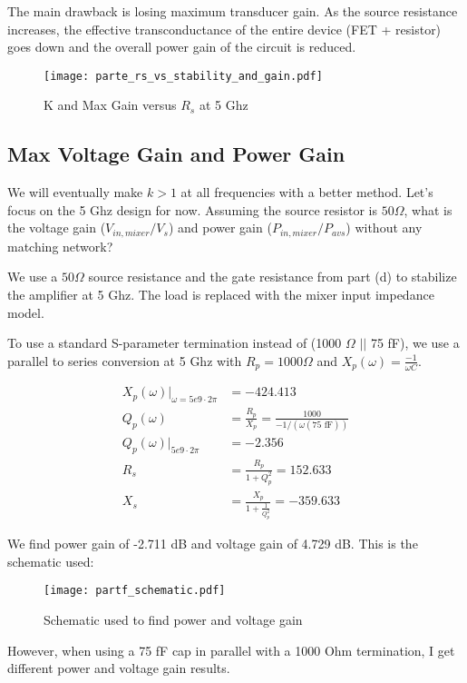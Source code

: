 The main drawback is losing maximum transducer gain. As the source resistance increases, the effective transconductance of the entire device (FET + resistor) goes down and the overall power gain of the circuit is reduced.

\begin{figure}[H]
    \centering \texttt{[image: parte\_rs\_vs\_stability\_and\_gain.pdf]}
    \caption{K and Max Gain versus $R_s$ at 5 Ghz}
\end{figure}

\subsection{Max Voltage Gain and Power Gain}
{\color{blue} We will eventually make $k > 1$ at all frequencies with a better method. Let's focus on the 5 Ghz design for now. Assuming the source resistor is $50 \Omega$, what is the voltage gain ($V_{in,mixer}/V_s$) and power gain ($P_{in,mixer}/P_{avs}$) without any matching network?}

We use a $50 \Omega$ source resistance and the gate resistance from part (d) to stabilize the amplifier at 5 Ghz. The load is replaced with the mixer input impedance model.

To use a standard S-parameter termination instead of (1000 $\Omega$ $||$ 75 fF), we use a parallel to series conversion at 5 Ghz with $R_p = 1000 \Omega$ and $X_p(\omega) = \frac{-1}{\omega C}$.

\begin{align*}
    X_p(\omega) \rvert_{\omega = 5e9 \cdot 2 \pi} &= -424.413 \\
    Q_p(\omega) &= \frac{R_p}{X_p} = \frac{1000}{-1 / (\omega (75 \text{ fF}))} \\
    Q_p(\omega) \rvert_{5e9 \cdot 2 \pi} &= -2.356 \\
    R_s &= \frac{R_p}{1 + Q_p^2} = 152.633 \\
    X_s &= \frac{X_p}{1 + \frac{1}{Q_p^2}} = -359.633
\end{align*}

We find power gain of -2.711 dB and voltage gain of 4.729 dB. This is the schematic used:

\begin{figure}[H]
    \centering \texttt{[image: partf\_schematic.pdf]}
    \caption{Schematic used to find power and voltage gain}
\end{figure}

However, when using a 75 fF cap in parallel with a 1000 Ohm termination, I get different power and voltage gain results.

